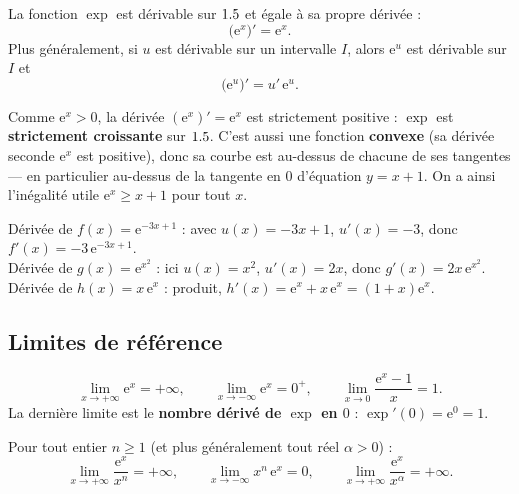 \begin{theoreme}
La fonction $\exp$ est dérivable sur $1.5$ et égale à sa propre dérivée :
\[
\big(\mathrm{e}^{x}\big)'=\mathrm{e}^{x}.
\]
Plus généralement, si $u$ est dérivable sur un intervalle $I$, alors $\mathrm{e}^{u}$ est
dérivable sur $I$ et
\[
\big(\mathrm{e}^{u}\big)'=u'\,\mathrm{e}^{u}.
\]
\end{theoreme}

\begin{remarque}
Comme $\mathrm{e}^{x}>0$, la dérivée $(\mathrm{e}^{x})'=\mathrm{e}^{x}$ est strictement positive :
$\exp$ est \textbf{strictement croissante} sur $1.5$. C'est aussi une fonction \textbf{convexe}
(sa dérivée seconde $\mathrm{e}^{x}$ est positive), donc sa courbe est au-dessus de chacune de ses
tangentes — en particulier au-dessus de la tangente en $0$ d'équation $y=x+1$. On a ainsi
l'inégalité utile $\mathrm{e}^{x}\ge x+1$ pour tout $x$.
\end{remarque}

\begin{exemple}
Dérivée de $f(x)=\mathrm{e}^{-3x+1}$ : avec $u(x)=-3x+1$, $u'(x)=-3$, donc
$f'(x)=-3\,\mathrm{e}^{-3x+1}$.\\
Dérivée de $g(x)=\mathrm{e}^{x^{2}}$ : ici $u(x)=x^{2}$, $u'(x)=2x$, donc
$g'(x)=2x\,\mathrm{e}^{x^{2}}$.\\
Dérivée de $h(x)=x\,\mathrm{e}^{x}$ : produit, $h'(x)=\mathrm{e}^{x}+x\,\mathrm{e}^{x}=(1+x)\mathrm{e}^{x}$.
\end{exemple}

\subsection*{Limites de référence}

\begin{theoreme}
\[
\lim_{x\to+\infty}\mathrm{e}^{x}=+\infty,\qquad
\lim_{x\to-\infty}\mathrm{e}^{x}=0^{+},\qquad
\lim_{x\to0}\frac{\mathrm{e}^{x}-1}{x}=1.
\]
La dernière limite est le \textbf{nombre dérivé de $\exp$ en $0$} : $\exp'(0)=\mathrm{e}^{0}=1$.
\end{theoreme}

\begin{theoreme}
Pour tout entier $n\ge 1$ (et plus généralement tout réel $\alpha>0$) :
\[
\lim_{x\to+\infty}\frac{\mathrm{e}^{x}}{x^{n}}=+\infty,\qquad
\lim_{x\to-\infty}x^{n}\,\mathrm{e}^{x}=0,\qquad
\lim_{x\to+\infty}\frac{\mathrm{e}^{x}}{x^{\alpha}}=+\infty.
\]
\end{theoreme}

